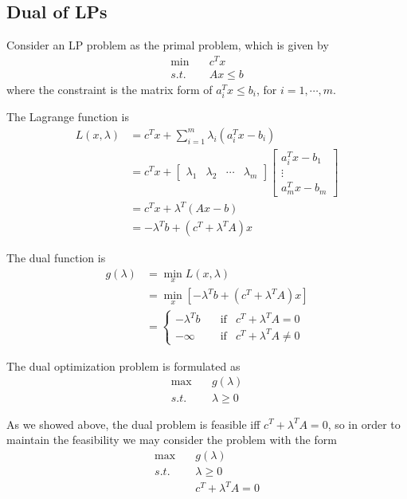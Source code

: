 




\vspace{0.5cm}
\subsection{Dual of LPs}
Consider an LP problem as the primal problem, which is given by
\begin{align*}
\min\quad &c^Tx\\
s.t.\quad &Ax\leq b
\end{align*}
where the constraint is the matrix form of $a_i^T x\leq b_i$, for $i=1,\cdots, m$.

The Lagrange function is 
\begin{align*}
L(x,\lambda) 
&= c^Tx + \sum^m_{i=1}\lambda_i (a_i^Tx-b_i)\\
&= c^Tx+
\begin{bmatrix}
\lambda_1&\lambda_2&\cdots&\lambda_m
\end{bmatrix}
\begin{bmatrix}
a_i^Tx-b_1\\
\vdots\\
a_m^Tx-b_m
\end{bmatrix} \\
&=c^Tx+\lambda^T(Ax-b)\\
&= -\lambda^Tb+(c^T+\lambda^TA)x
\end{align*}

The dual function is
\begin{align*}
g(\lambda) 
&= \min_x L(x,\lambda) \\
&= \min_x[-\lambda^Tb+(c^T+\lambda^TA)x]\\
&=
\label{eq6}
\left\{
\begin{aligned}
-\lambda^Tb &\quad \text{if} & c^T+\lambda^TA=0 \\
-\infty &\quad \text{if} & c^T+\lambda^TA\neq 0
\end{aligned}
\right.
\end{align*}

The dual optimization problem is formulated as
\begin{align*}
\max\quad &g(\lambda)\\
s.t.\quad &\lambda \geq 0
\end{align*}

As we showed above, the dual problem is feasible iff $c^T+\lambda^TA=0$, so in order to maintain the feasibility we may consider the problem with the form
\begin{align*}
\max\quad &g(\lambda)\\
s.t.\quad &\lambda\geq 0\\
&c^T+\lambda^TA=0
\end{align*}

